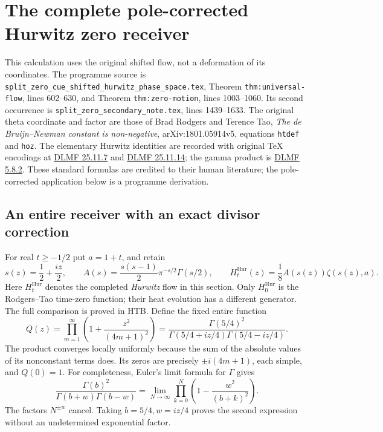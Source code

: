 \section{The complete pole-corrected Hurwitz zero receiver}
\label{sec:hurwitz-pole-receiver}

This calculation uses the original shifted flow, not a deformation of its
coordinates. The programme source is
\nolinkurl{split_zero_cue_shifted_hurwitz_phase_space.tex},
Theorem \texttt{thm:universal-flow}, lines 602--630, and
Theorem \texttt{thm:zero-motion}, lines 1003--1060.
Its second occurrence is \nolinkurl{split_zero_secondary_note.tex},
lines 1439--1633. The original theta coordinate and factor are those of
Brad Rodgers and Terence Tao, \emph{The de Bruijn--Newman constant is
non-negative}, arXiv:1801.05914v5, equations \texttt{htdef} and \texttt{hoz}.
The elementary Hurwitz identities are recorded with original TeX encodings at
\href{https://dlmf.nist.gov/25.11.E7}{DLMF 25.11.7} and
\href{https://dlmf.nist.gov/25.11.E14}{DLMF 25.11.14}; the gamma product is
\href{https://dlmf.nist.gov/5.8.E2}{DLMF 5.8.2}.
These standard formulas are credited to their human literature; the
pole-corrected application below is a programme derivation.

\subsection{An entire receiver with an exact divisor correction}

For real $t\ge-1/2$ put $a=1+t$, and retain
\begin{equation}\tag{HPR1}
 s(z)=\frac12+\frac{iz}{2},\qquad
 A(s)=\frac{s(s-1)}2\pi^{-s/2}\Gamma(s/2),\qquad
 H_t^{\mathrm{Hur}}(z)=\frac18 A(s(z))\zeta(s(z),a).
\end{equation}
Here $H_t^{\mathrm{Hur}}$ denotes the completed \emph{Hurwitz} flow in this section.
Only $H_0^{\mathrm{Hur}}$ is the Rodgers--Tao time-zero function; their heat evolution
has a different generator. The full comparison is proved in HTB.
Define the fixed entire function
\begin{equation}\tag{HPR2}
 Q(z)=\prod_{m=1}^{\infty}\left(1+\frac{z^2}{(4m+1)^2}\right)
 =\frac{\Gamma(5/4)^2}
 {\Gamma(5/4+iz/4)\Gamma(5/4-iz/4)}.
\end{equation}
The product converges locally uniformly because the sum of the absolute
values of its nonconstant terms does. Its zeros are precisely
$\pm i(4m+1)$, each simple, and $Q(0)=1$.
For completeness, Euler's limit formula for $\Gamma$ gives
\[
 \frac{\Gamma(b)^2}{\Gamma(b+w)\Gamma(b-w)}
 =\lim_{N\to\infty}\prod_{k=0}^{N}
                 \left(1-\frac{w^2}{(b+k)^2}\right).
\]
The factors $N^{\pm w}$ cancel. Taking $b=5/4,w=iz/4$ proves
the second expression without an undetermined exponential factor.

